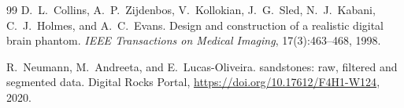 \documentclass[11pt]{article}
\begin{document}
\begin{thebibliography}{99}
D.~L.~Collins, A.~P.~Zijdenbos, V.~Kollokian, J.~G.~Sled, N.~J.~Kabani,
C.~J.~Holmes, and A.~C.~Evans.
\newblock Design and construction of a realistic digital brain phantom.
\newblock \emph{IEEE Transactions on Medical Imaging}, 17(3):463--468, 1998.

R.~Neumann, M.~Andreeta, and E.~Lucas-Oliveira.
 sandstones: raw, filtered and segmented data.
\newblock Digital Rocks Portal, \url{https://doi.org/10.17612/F4H1-W124}, 2020.

\end{thebibliography}
\end{document}
